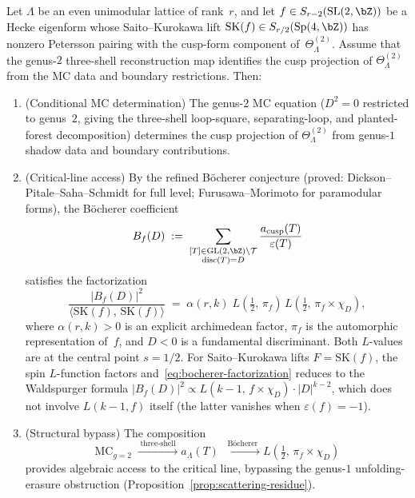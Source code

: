 \begin{theorem}%
\label{thm:bocherer-bridge}%
%
Let $\Lambda$ be an even unimodular lattice of rank~$r$, and let
$f \in S_{r-2}(\mathrm{SL}(2,\bZ))$ be a Hecke eigenform whose
Saito--Kurokawa lift
$\mathrm{SK}(f) \in S_{r/2}(\mathrm{Sp}(4,\bZ))$
has nonzero Petersson pairing with the cusp-form component
of~$\Theta_\Lambda^{(2)}$. Assume that the genus-$2$ three-shell
reconstruction map identifies the cusp projection of
$\Theta_\Lambda^{(2)}$ from the MC data and boundary restrictions.
Then:
\begin{enumerate}[label=\textup{(\roman*)}]
\item \textup{(Conditional MC determination)}
The genus-$2$ MC equation
\textup{(}$D^2 = 0$ restricted to genus~$2$, giving the three-shell
loop-square, separating-loop, and planted-forest decomposition\textup{)}
determines the cusp projection of $\Theta_\Lambda^{(2)}$ from
genus-$1$ shadow data and boundary contributions.

\item \textup{(Critical-line access)}
By the refined B\"ocherer conjecture
\textup{(}proved: Dickson--Pitale--Saha--Schmidt
\cite{DPSS20} for full level;
Furusawa--Morimoto \cite{FurusawaMorimoto14}
for paramodular forms\textup{)},
the B\"ocherer coefficient
\begin{equation}\label{eq:bocherer-coefficient-def}
B_f(D)
\;:=\;
\sum_{\substack{[T] \in \mathrm{GL}(2,\bZ) \backslash \mathcal{T} \\
 \operatorname{disc}(T) = D}}
\frac{a_{\mathrm{cusp}}(T)}{\varepsilon(T)}
\end{equation}
satisfies the factorization
\begin{equation}\label{eq:bocherer-factorization}
\frac{|B_f(D)|^2}{\langle \mathrm{SK}(f),\, \mathrm{SK}(f) \rangle}
\;=\;
\alpha(r,k)\;
L\!\left(\tfrac12,\, \pi_f\right)\,
L\!\left(\tfrac12,\, \pi_f \times \chi_D\right),
\end{equation}
where $\alpha(r,k) > 0$ is an explicit archimedean factor,
$\pi_f$ is the automorphic representation of~$f$,
and $D < 0$ is a fundamental discriminant.
Both $L$-values are at the central point $s = 1/2$.
For Saito--Kurokawa lifts $F = \mathrm{SK}(f)$, the spin
$L$-function factors and~\eqref{eq:bocherer-factorization}
reduces to the Waldspurger formula
$\lvert B_f(D)\rvert^2 \propto L(k{-}1,\, f \times \chi_D)
\cdot \lvert D\rvert^{k-2}$,
which does not involve $L(k{-}1,f)$ itself
\textup{(}the latter vanishes when
$\varepsilon(f) = -1$\textup{)}.

\item \textup{(Structural bypass)}
The composition
\[
\text{MC}_{g=2}
\;\xrightarrow{\;\text{three-shell}\;}
a_\Lambda(T)
\;\xrightarrow{\;\text{B\"ocherer}\;}
L\!\left(\tfrac12,\, \pi_f \times \chi_D\right)
\]
provides algebraic access to the critical line, bypassing
the genus-$1$ unfolding-erasure obstruction
\textup{(}Proposition~\textup{\ref{prop:scattering-residue}}\textup{)}.
\end{enumerate}
\end{theorem}

